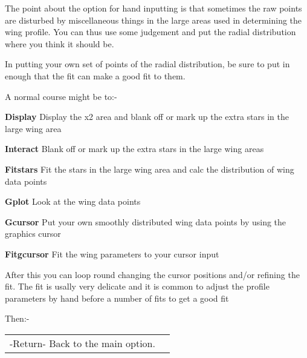 \begin{small}
{{ The point about the option for hand inputting is that sometimes
 the raw points are disturbed by miscellaneous things in the large
 areas used in determining the wing profile. You can thus use
 some judgement and put the radial distribution where you think it
 should be.
 
 In putting your own set of points of the radial distribution, be sure
 to put in enough that the fit can make a good fit to them.
 
   A normal course might be to:-
 
\begin{list}{{-}}{}
 
\item {\bf Display \hspace*{2ex}} Display the x2 area and blank
                                  off or mark up the extra stars
                                  in the large wing area
\item {\bf Interact \hspace*{2ex}}   Blank off or mark up the extra
                                  stars in the large wing areas
\item {\bf Fit{\undersc}stars \hspace*{2ex}}    Fit the stars in
                                  the large wing area and calc
                                  the distribution of wing data points
\item {\bf Gplot \hspace*{2ex}}   Look at the wing data points
\item {\bf Gcursor \hspace*{2ex}} Put your own smoothly distributed
                                  wing data points by using the
                                  graphics cursor
\item {\bf Fit{\undersc}gcursor \hspace*{2ex}}    Fit the wing
                                  parameters to your cursor input
\end{list}
 
   After this you can loop round changing the cursor positions
   and/or refining the fit. The fit is usally very delicate
   and it is common to adjust the profile parameters by hand
   before a number of fits to get a good fit
 
    Then:-
 
\begin{tabular}{lp{4in}}
      -Return-       Back to the main option.
\end{tabular}
 
}}
\end{small}
